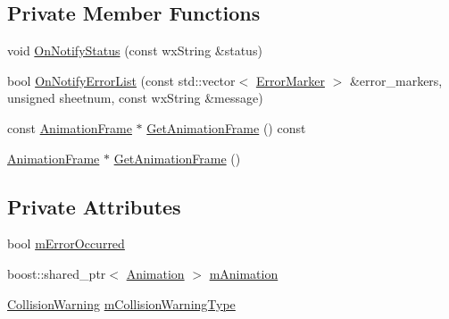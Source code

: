 \subsection*{Private Member Functions}
\begin{DoxyCompactItemize}
\item 
void \hyperlink{a00015_aa460b7eea0b7b1419b35c82dfea8ead5}{On\-Notify\-Status} (const wx\-String \&status)
\item 
bool \hyperlink{a00015_a66ae9999855ae5635ae3b57cfef2fa1f}{On\-Notify\-Error\-List} (const std\-::vector$<$ \hyperlink{a00098}{Error\-Marker} $>$ \&error\-\_\-markers, unsigned sheetnum, const wx\-String \&message)
\item 
const \hyperlink{a00012}{Animation\-Frame} $\ast$ \hyperlink{a00015_a38d7eab0f899609fdc3855c82a50742f}{Get\-Animation\-Frame} () const 
\item 
\hyperlink{a00012}{Animation\-Frame} $\ast$ \hyperlink{a00015_a881c3da184fff75ad5736bccc35cee02}{Get\-Animation\-Frame} ()
\end{DoxyCompactItemize}
\subsection*{Private Attributes}
\begin{DoxyCompactItemize}
\item 
bool \hyperlink{a00015_a99b4e9fd56411a15e3b2d0834f7ee82c}{m\-Error\-Occurred}
\item 
boost\-::shared\-\_\-ptr$<$ \hyperlink{a00010}{Animation} $>$ \hyperlink{a00015_a8b7370c70c1834443cc7b834b9d964fc}{m\-Animation}
\item 
\hyperlink{a00196_acf6b899fff4fd35a31a3e8884229f118}{Collision\-Warning} \hyperlink{a00015_af1157a855b84821ec8c1ab1843f4b655}{m\-Collision\-Warning\-Type}
\end{DoxyCompactItemize}


